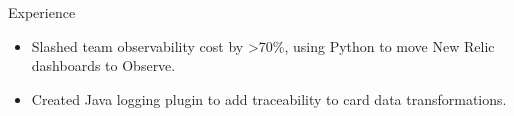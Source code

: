 \documentclass{resume} %
\begin{document}
\begin{workSection}{Experience}
\begin{itemize}
		\item Slashed team observability cost by >70\%, using Python to move New Relic dashboards to Observe.
		\item Created Java logging plugin to add traceability to card data transformations.
	\end{itemize}
	
	

\end{workSection}
\end{document}
